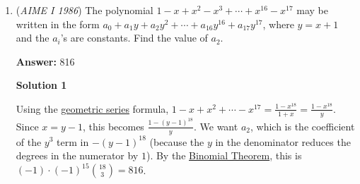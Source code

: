\begin{enumerate}
 


 



\textbf{Solution 3}

Let $n=abc$ then
 \[N=222(a+b+c)-n\]
 \[N=222(a+b+c)-100a-10b-c=3194\]Since $0<100a+10b+c<1000$, we get the inequality
 \[N<222(a+b+c)<N+1000\]
 \[3194<222(a+b+c)<4194\]
 \[14<a+b+c<19\]Checking each of the multiples of $222$ from $15\cdot222$ to $18\cdot222$ by subtracting $N$ from each $222(a+b+c)$, we quickly find $n=\boxed{358}$




\textbf{Solution 4}

The sum of the five numbers is $222(a+b+c)-100a-10b-c=122a+212b+221c=122(a+b+c)+9(10b+11c)=3194$ We can see that $3194 \equiv 8$ (mod $9$) and $122 \equiv 5$ (mod $9$) so we need to make sure that $a+b+c \equiv 7$ (mod $9$) by some testing. So we let $a+b+c=9k+7$

 Then, we know that $1\leq a+b+c \leq 27$ so only $7,16,25$ lie in the interval

 When we test $a+b+c=25, 10b+11c=16$, impossible

 When we test $a+b+c=16, 10b+11c=138, b=5,c=8,a=3$

 When we test $a+b+c=7, 10b+11c=260$, well, it's impossible

 The answer is $\boxed{358}$ then

 


	\item (\textit{AIME I 1986}) The polynomial $1-x+x^2-x^3+\cdots+x^{16}-x^{17}$ may be written in the form $a_0+a_1y+a_2y^2+\cdots +a_{16}y^{16}+a_{17}y^{17}$, where $y=x+1$ and the $a_i$'s are constants. Find the value of $a_2$.


 
 \textbf{Answer: }816



\textbf{Solution 1}

Using the \href{https://artofproblemsolving.com/wiki/index.php?title=Geometric\_series}{geometric series} formula, $1 - x + x^2 + \cdots - x^{17} = \frac {1 - x^{18}}{1 + x} = \frac {1-x^{18}}{y}$. Since $x = y - 1$, this becomes $\frac {1-(y - 1)^{18}}{y}$. We want $a_2$, which is the coefficient of the $y^3$ term in $-(y - 1)^{18}$ (because the $y$ in the denominator reduces the degrees in the numerator by $1$). By the \href{https://artofproblemsolving.com/wiki/index.php?title=Binomial\_Theorem}{Binomial Theorem}, this is $(-1) \cdot (-1)^{15}{18 \choose 3} = \boxed{816}$.


\end{enumerate}
